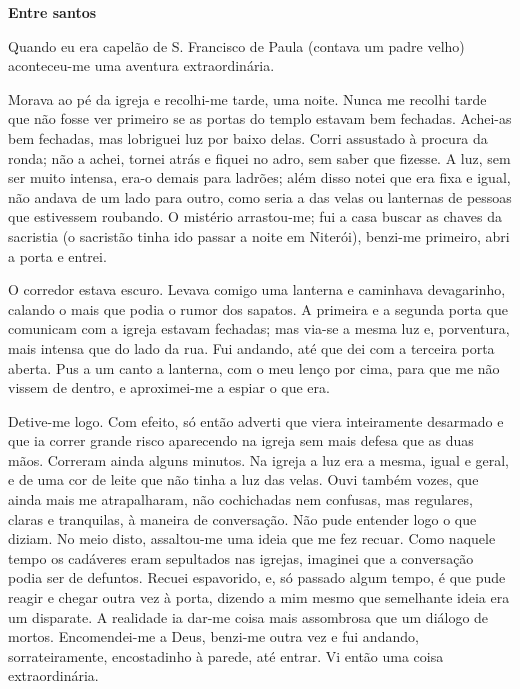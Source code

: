 \textbf{Entre santos}

Quando eu era capelão de S. Francisco de Paula (contava um padre velho)
aconteceu-me uma aventura extraordinária.

Morava ao pé da igreja e recolhi-me tarde, uma noite. Nunca me recolhi
tarde que não fosse ver primeiro se as portas do templo estavam bem
fechadas. Achei-as bem fechadas, mas lobriguei luz por baixo delas.
Corri assustado à procura da ronda; não a achei, tornei atrás e fiquei
no adro, sem saber que fizesse. A luz, sem ser muito intensa, era-o
demais para ladrões; além disso notei que era fixa e igual, não andava
de um lado para outro, como seria a das velas ou lanternas de pessoas
que estivessem roubando. O mistério arrastou-me; fui a casa buscar as
chaves da sacristia (o sacristão tinha ido passar a noite em Niterói),
benzi-me primeiro, abri a porta e entrei.

O corredor estava escuro. Levava comigo uma lanterna e caminhava
devagarinho, calando o mais que podia o rumor dos sapatos. A primeira e
a segunda porta que comunicam com a igreja estavam fechadas; mas via-se
a mesma luz e, porventura, mais intensa que do lado da rua. Fui andando,
até que dei com a terceira porta aberta. Pus a um canto a lanterna, com
o meu lenço por cima, para que me não vissem de dentro, e aproximei-me a
espiar o que era.

Detive-me logo. Com efeito, só então adverti que viera inteiramente
desarmado e que ia correr grande risco aparecendo na igreja sem mais
defesa que as duas mãos. Correram ainda alguns minutos. Na igreja a luz
era a mesma, igual e geral, e de uma cor de leite que não tinha a luz
das velas. Ouvi também vozes, que ainda mais me atrapalharam, não
cochichadas nem confusas, mas regulares, claras e tranquilas, à maneira
de conversação. Não pude entender logo o que diziam. No meio disto,
assaltou-me uma ideia que me fez recuar. Como naquele tempo os cadáveres
eram sepultados nas igrejas, imaginei que a conversação podia ser de
defuntos. Recuei espavorido, e, só passado algum tempo, é que pude
reagir e chegar outra vez à porta, dizendo a mim mesmo que semelhante
ideia era um disparate. A realidade ia dar-me coisa mais assombrosa que
um diálogo de mortos. Encomendei-me a Deus, benzi-me outra vez e fui
andando, sorrateiramente, encostadinho à parede, até entrar. Vi então
uma coisa extraordinária.

